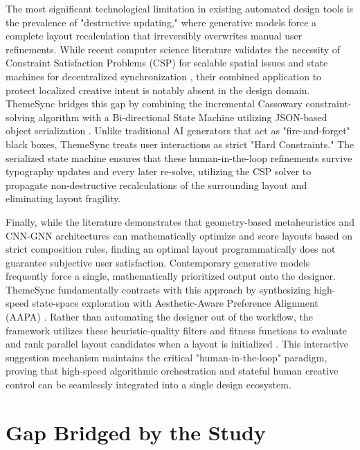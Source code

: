 \begin{refsection}
The most significant technological limitation in existing automated design tools is the prevalence of "destructive updating," where generative models force a complete layout recalculation that irreversibly overwrites manual user refinements. While recent computer science literature validates the necessity of Constraint Satisfaction Problems (CSP) for scalable spatial issues \cite{Li2024SMT, Penko2025LLM, Zhang2025Scalable} and state machines for decentralized synchronization \cite{Liang2020Bidirectional, Prymushko2025CRDT, Gomes2025ConflictSync}, their combined application to protect localized creative intent is notably absent in the design domain. ThemeSync bridges this gap by combining the incremental Cassowary constraint-solving algorithm \cite{Badros2001Cassowary} with a Bi-directional State Machine utilizing JSON-based object serialization \cite{Berdan2025Formats}. Unlike traditional AI generators that act as "fire-and-forget" black boxes, ThemeSync treats user interactions as strict "Hard Constraints." The serialized state machine ensures that these human-in-the-loop refinements survive typography updates and every later re-solve, utilizing the CSP solver to propagate non-destructive recalculations of the surrounding layout and eliminating layout fragility.

Finally, while the literature demonstrates that geometry-based metaheuristics \cite{Got2021Hybrid, Vinod2022Nature, Qais2022Circle} and CNN-GNN architectures \cite{Guo2025Aesthetic, Zheng2025Interior} can mathematically optimize and score layouts based on strict composition rules, finding an optimal layout programmatically does not guarantee subjective user satisfaction. Contemporary generative models frequently force a single, mathematically prioritized output onto the designer. ThemeSync fundamentally contrasts with this approach by synthesizing high-speed state-space exploration with Aesthetic-Aware Preference Alignment (AAPA) \cite{Patnaik2025AesthetiQ}. Rather than automating the designer out of the workflow, the framework utilizes these heuristic-quality filters and fitness functions to evaluate and rank parallel layout candidates when a layout is initialized \cite{Li2023Fairness}. This interactive suggestion mechanism maintains the critical "human-in-the-loop" paradigm, proving that high-speed algorithmic orchestration and stateful human creative control can be seamlessly integrated into a single design ecosystem.

\section{Gap Bridged by the Study}


\end{refsection}
